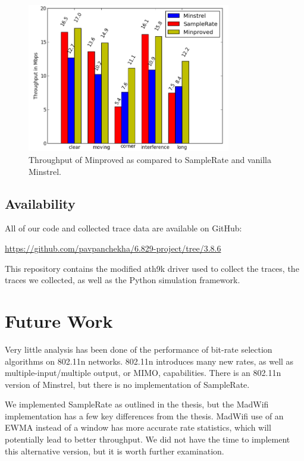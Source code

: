 \documentclass[letterpaper,twocolumn,10pt]{article}
\begin{document}
\begin{figure}[htb]
  \hspace{-2em}\includegraphics[width=3.5in]{mnVSspVSmp1.png}\vspace{-0em}
  \caption{Throughput of Minproved as compared to SampleRate and vanilla Minstrel.}
\label{figure:4}
\end{figure}


\subsection{Availability}
All of our code and collected trace data are available on GitHub:

\noindent
{\small\url{https://github.com/pavpanchekha/6.829-project/tree/3.8.6}}

This repository contains the modified ath9k driver used to collect the
traces, the traces we collected, as well as the Python simulation
framework.

\section{Future Work}

Very little analysis has been done of the performance of bit-rate
selection algorithms on 802.11n networks. 802.11n introduces many new
rates, as well as multiple-input/multiple output, or MIMO,
capabilities. There is an 802.11n version of Minstrel, but there is no
implementation of SampleRate.

We implemented SampleRate as outlined in the thesis, but the MadWifi
implementation has a few key differences from the thesis. MadWifi 
use of an EWMA instead of a window has more accurate
rate statistics, which will potentially lead to better throughput. We
did not have the time to implement this alternative version, but it is
worth further examination.
\end{document}
